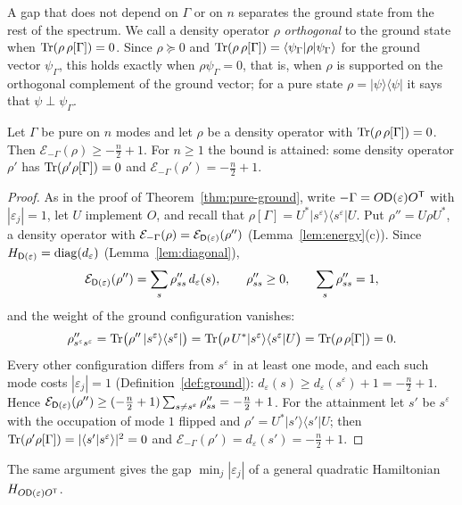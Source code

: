A gap that does not depend on $\Gamma$ or on $n$ separates the ground state from the rest
of the spectrum. We call a density operator $\rho$ \emph{orthogonal} to the ground state when
$\operatorname{Tr}(\rho\,\rho[\Gamma])=0$. Since $\rho\succeq0$ and $\operatorname{Tr}(\rho\,\rho[\Gamma])=\langle\psi_\Gamma|\rho|\psi_\Gamma\rangle$ for the
ground vector $\psi_\Gamma$, this holds exactly when $\rho\psi_\Gamma=0$, that is, when $\rho$ is supported on
the orthogonal complement of the ground vector; for a pure state $\rho=|\psi\rangle\langle\psi|$ it says
that $\psi\perp\psi_\Gamma$.
\begin{theorem}\label{thm:gap}
Let $\Gamma$ be pure on $n$ modes and let $\rho$ be a density operator with
$\operatorname{Tr}(\rho\,\rho[\Gamma])=0$. Then $\mathcal E_{-\Gamma}(\rho)\geq-\tfrac n2+1$. For $n\geq1$ the bound is
attained: some density operator $\rho'$ has $\operatorname{Tr}(\rho'\rho[\Gamma])=0$ and
$\mathcal E_{-\Gamma}(\rho')=-\tfrac n2+1$.
\end{theorem}
\begin{proof}
As in the proof of Theorem~\ref{thm:pure-ground}, write $-\Gamma=O\mathsf D(\varepsilon)O^{\mathsf T}$ with
$|\varepsilon_j|=1$, let $U$ implement $O$, and recall that
$\rho[\Gamma]=U^*|s^\varepsilon\rangle\langle s^\varepsilon|U$. Put $\rho''=U\rho U^*$, a density
operator with $\mathcal E_{-\Gamma}(\rho)=\mathcal E_{\mathsf D(\varepsilon)}(\rho'')$
(Lemma~\ref{lem:energy}(c)). Since $H_{\mathsf D(\varepsilon)}=\operatorname{diag}(d_\varepsilon)$
(Lemma~\ref{lem:diagonal}),
\[
 \mathcal E_{\mathsf D(\varepsilon)}(\rho'')=\sum_s\rho''_{ss}\,d_\varepsilon(s),\qquad
 \rho''_{ss}\geq0,\qquad \sum_s\rho''_{ss}=1,
\]
and the weight of the ground configuration vanishes:
\[
 \rho''_{s^\varepsilon s^\varepsilon}=\operatorname{Tr}\bigl(\rho''\,|s^\varepsilon\rangle\langle s^\varepsilon|\bigr)
 =\operatorname{Tr}\bigl(\rho\,U^*|s^\varepsilon\rangle\langle s^\varepsilon|U\bigr)=\operatorname{Tr}(\rho\,\rho[\Gamma])=0.
\]
Every other configuration differs from $s^\varepsilon$ in at least one mode, and each such mode
costs $|\varepsilon_j|=1$ (Definition~\ref{def:ground}): $d_\varepsilon(s)\geq d_\varepsilon(s^\varepsilon)+1=-\tfrac n2+1$.
Hence $\mathcal E_{\mathsf D(\varepsilon)}(\rho'')\geq(-\tfrac n2+1)\sum_{s\neq s^\varepsilon}\rho''_{ss}=-\tfrac n2+1$.
For the attainment let $s'$ be $s^\varepsilon$ with the occupation of mode $1$ flipped and
$\rho'=U^*|s'\rangle\langle s'|U$; then $\operatorname{Tr}(\rho'\rho[\Gamma])=|\langle s'|s^\varepsilon\rangle|^2=0$
and $\mathcal E_{-\Gamma}(\rho')=d_\varepsilon(s')=-\tfrac n2+1$.
\end{proof}
The same argument gives the gap $\min_j|\varepsilon_j|$ of a general quadratic Hamiltonian
$H_{O\mathsf D(\varepsilon)O^{\mathsf T}}$.

